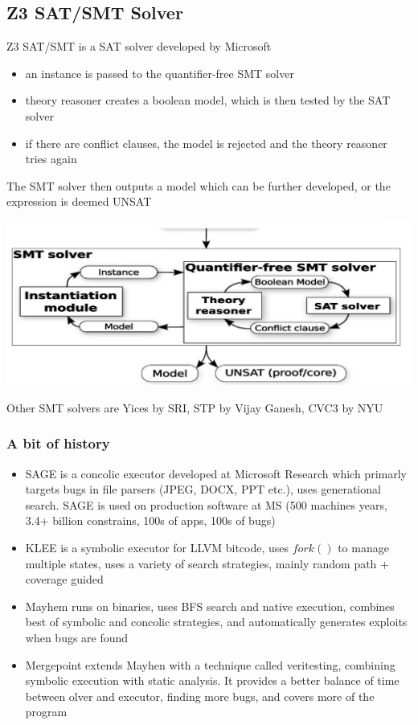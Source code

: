 \documentclass[11pt, oneside]{article}   	%
\begin{document}
\subsection*{Z3 SAT/SMT Solver}
Z3 SAT/SMT is a SAT solver developed by Microsoft
\begin{itemize}
\item an instance is passed to the quantifier-free SMT solver
\item theory reasoner creates a boolean model, which is then tested by the SAT solver
\item if there are conflict clauses, the model is rejected and the theory reasoner tries again
\end{itemize}
The SMT solver then outputs a model which can be further developed, or the expression is deemed UNSAT
\begin{center}
\includegraphics[scale = 0.4]{theory}
\end{center}
Other SMT solvers are Yices by SRI, STP by Vijay Ganesh, CVC3 by NYU
\subsubsection*{A bit of history}
\begin{itemize}
\item SAGE is a concolic executor developed at Microsoft Research which primarly targets bugs in file parsers (JPEG, DOCX, PPT etc.), uses generational search. SAGE is used on production software at MS (500 machines years, 3.4+ billion constrains, 100s of apps, 100s of bugs)
\item KLEE is a symbolic executor for LLVM bitcode, uses $fork()$ to manage multiple states, uses a variety of search strategies, mainly random path + coverage guided
\item Mayhem runs on binaries, uses BFS search and native execution, combines best of symbolic and concolic strategies, and automatically generates exploits when bugs are found
\item Mergepoint extends Mayhen with a technique called veritesting, combining symbolic execution with static analysis. It provides a better balance of time between olver and executor, finding more bugs, and covers more of the program
\end{itemize}
\end{document}
